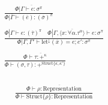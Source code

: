 \documentclass {article}
\begin{document}
\begin{gather*}
\frac
{\Phi | \overline { \Gamma \vdash e : \sigma^\pi }}
{\Phi | \overline \Gamma  \vdash (\overline e) : (\overline \sigma)^\pi } \\
\\
\frac
{\Phi | \Gamma \vdash e : (\overline \tau)^\pi \quad \Phi | \Gamma , \overline {\langle x : \forall \alpha. \tau^\alpha \rangle} \vdash e : \sigma^\pi}
{\Phi | \Gamma, \Gamma' \vdash \text{let}^\downarrow (\overline x) = e; e' : \sigma^\pi} \\
\\
\frac
{\Phi \vdash \overline {\tau : +^{\kappa}} }
{\Phi \vdash (\sigma, \tau) : +^{\text{Struct} \{ \kappa,\kappa'\}}} \\
\end{gather*}


\begin{gather*}
\frac
{\Phi \vdash \overline {\rho : \text{Representation}}}
{\Phi \vdash \text{Struct} \{ \overline \rho \} : \text{Representation} } \\
\end{gather*}
\end{document}
